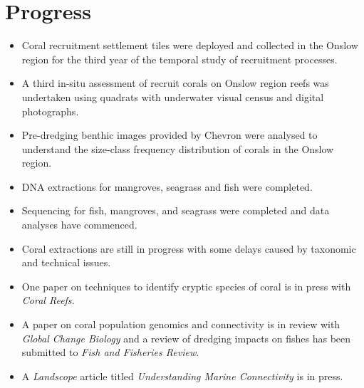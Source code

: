 \documentclass[version=last,
    paper=a4, %
    10pt, %
    usenames,
    dvipsnames,
    oneside, %
    headings=openany, %
    DIV=15 %
]{scrbook}
\begin{document}
\section*{Progress}
\begin{itemize}
\itemsep1pt\parskip0pt
\item
  Coral recruitment settlement tiles were deployed and collected in the
  Onslow region for the third year of the temporal study of recruitment
  processes.
\item
  A third in-situ assessment of recruit corals on Onslow region reefs
  was undertaken using quadrats with underwater visual census and
  digital photographs.
\item
  Pre-dredging benthic images provided by Chevron were analysed to
  understand the size-class frequency distribution of corals in the
  Onslow region.
\item
  DNA extractions for mangroves, seagrass and fish were completed.
\item
  Sequencing for fish, mangroves, and seagrass were completed and data
  analyses have commenced.
\item
  Coral extractions are still in progress with some delays caused by
  taxonomic and technical issues.
\item
  One paper on techniques to identify cryptic species of coral is in
  press with \emph{Coral Reefs.}
\item
  A paper on coral population genomics and connectivity is in review
  with \emph{Global Change Biology} and a review of dredging impacts on
  fishes has been submitted to \emph{Fish and Fisheries Review}.
\item
  A \emph{Landscope} article titled \emph{Understanding Marine
  Connectivity} is in press.
\end{itemize}
\end{document}
